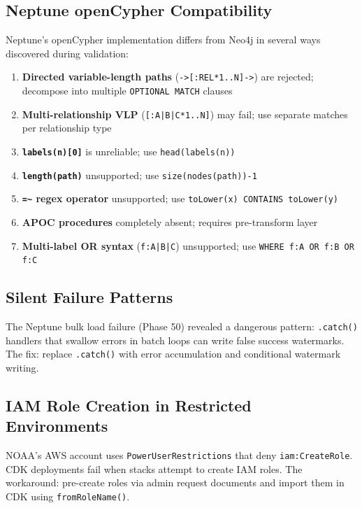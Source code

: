 \documentclass[11pt,letterpaper]{article}
\begin{document}
\subsection{Neptune openCypher Compatibility}

Neptune's openCypher implementation differs from Neo4j in several ways
discovered during validation:

\begin{enumerate}[noitemsep]
    \item \textbf{Directed variable-length paths} (\texttt{->[:REL*1..N]->})
          are rejected; decompose into multiple \texttt{OPTIONAL MATCH} clauses
    \item \textbf{Multi-relationship VLP} (\texttt{[:A|B|C*1..N]}) may fail;
          use separate matches per relationship type
    \item \textbf{\texttt{labels(n)[0]}} is unreliable; use \texttt{head(labels(n))}
    \item \textbf{\texttt{length(path)}} unsupported; use \texttt{size(nodes(path))-1}
    \item \textbf{\texttt{=\~{}} regex operator} unsupported; use
          \texttt{toLower(x) CONTAINS toLower(y)}
    \item \textbf{APOC procedures} completely absent; requires pre-transform layer
    \item \textbf{Multi-label OR syntax} (\texttt{f:A|B|C}) unsupported; use
          \texttt{WHERE f:A OR f:B OR f:C}
\end{enumerate}

\subsection{Silent Failure Patterns}

The Neptune bulk load failure (Phase 50) revealed a dangerous pattern:
\texttt{.catch()} handlers that swallow errors in batch loops can write
false success watermarks. The fix: replace \texttt{.catch()} with error
accumulation and conditional watermark writing.

\subsection{IAM Role Creation in Restricted Environments}

NOAA's AWS account uses \texttt{PowerUserRestrictions} that deny
\texttt{iam:CreateRole}. CDK deployments fail when stacks attempt to
create IAM roles. The workaround: pre-create roles via admin request
documents and import them in CDK using \texttt{fromRoleName()}.
\end{document}
